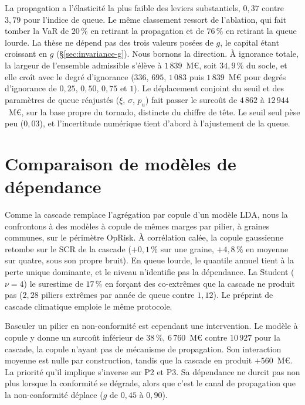 \vspace{4pt}
\noindent La propagation a l'élasticité la plus faible des leviers substantiels, $0{,}37$ contre
$3{,}79$ pour l'indice de queue. Le même classement ressort de l'ablation, qui fait tomber la VaR de
$20\,\%$ en retirant la propagation et de $76\,\%$ en retirant la queue lourde. La thèse ne dépend pas des trois valeurs
posées de $g$, le capital étant croissant en $g$ (\S\ref{sec:invariance-g}). Nous bornons la direction.
À ignorance totale, la largeur de l'ensemble admissible s'élève à $1\,839$~M\euro, soit $34{,}9\,\%$
du socle, et elle croît avec le degré d'ignorance ($336$, $695$, $1\,083$ puis $1\,839$~M\euro{} pour
degrés d'ignorance de $0{,}25$, $0{,}50$, $0{,}75$ et $1$). Le déplacement
conjoint du seuil et des paramètres de queue réajustés ($\xi$, $\sigma$, $p_u$) fait passer le
surcoût de $4\,862$ à $12\,944$~M\euro, sur la base propre du tornado, distincte du chiffre de tête.
Le seuil seul pèse peu ($0{,}03$), et l'incertitude numérique tient d'abord à l'ajustement de la queue.

\section{Comparaison de modèles de dépendance}
\label{sec:benchmark}

Comme la cascade remplace l'agrégation par copule d'un modèle LDA, nous la confrontons à des modèles à copule
de mêmes marges par pilier, à graines communes, sur le périmètre OpRisk. À corrélation
calée, la copule gaussienne retombe sur le SCR de la cascade ($+0{,}1\,\%$ sur une graine,
$+4{,}8\,\%$ en moyenne sur quatre, sous son propre bruit). En queue lourde, le quantile annuel
tient à la perte unique dominante, et le niveau n'identifie pas la dépendance. La Student
($\nu = 4$) le surestime de $17\,\%$ en forçant des co-extrêmes que la cascade ne produit pas
($2{,}28$ piliers extrêmes par année de queue contre $1{,}12$). Le préprint de cascade climatique
\citep{ccrn2026} emploie le même protocole.

Basculer un pilier en non-conformité est cependant une intervention. Le modèle à copule y donne un
surcoût inférieur de $38\,\%$, $6\,760$~M\euro{} contre $10\,927$ pour la cascade, la copule n'ayant
pas de mécanisme de propagation. Son interaction moyenne est nulle par construction, tandis que la
cascade en produit $+560$~M\euro{}. La priorité qu'il implique s'inverse sur P2 et P3. Sa dépendance
ne durcit pas non plus lorsque la conformité se dégrade, alors que c'est le canal de propagation que la non-conformité
déplace ($g$ de $0{,}45$ à $0{,}90$).

